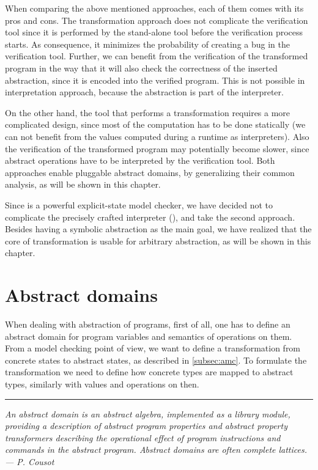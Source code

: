 When comparing the above mentioned approaches, each of them comes with its pros
and cons. The transformation approach does not complicate the verification tool
since it is performed by the stand-alone tool before the verification process
starts. As consequence, it minimizes the probability of creating a bug in the
verification tool. Further, we can benefit from the verification of the
transformed program in the way that it will also check the correctness of the
inserted abstraction, since it is encoded into the verified program. This is not possible
in interpretation approach, because the abstraction is part of the interpreter.

On the other hand, the tool that performs a transformation requires a more
complicated design, since most of the computation has to be done statically (we
can not benefit from the values computed during a runtime as interpreters). Also
the verification of the transformed program may potentially become slower, since
abstract operations have to be interpreted by the verification tool.  Both
approaches enable pluggable abstract domains, by generalizing their common
analysis, as will be shown in this chapter.

Since \DIVINE is a powerful explicit-state model checker, we have decided not to
complicate the precisely crafted interpreter (\DIVM), and take the second
approach. Besides having a symbolic abstraction as the main goal, we have
realized that the core of transformation is usable for arbitrary abstraction, as
will be shown in this chapter.

\section{Abstract domains} \label{sec:absdom}

When dealing with abstraction of programs, first of all, one has to define an
abstract domain for program variables and semantics of operations on them. From
a model checking point of view, we want to define a transformation from
concrete states to abstract states, as described in \autoref{subsec:amc}. To
formulate the transformation we need to define how concrete types are mapped to
abstract types, similarly with values and operations on then.

\newpage

\hrule

\bigskip
\noindent
\textit{An abstract domain is an abstract algebra, implemented as a library module,
providing a description of abstract program properties and abstract property
transformers describing the operational effect of program instructions and
commands in the abstract program. Abstract domains are often complete lattices.
--- P. Cousot \cite{Cousot79} }
\bigskip

